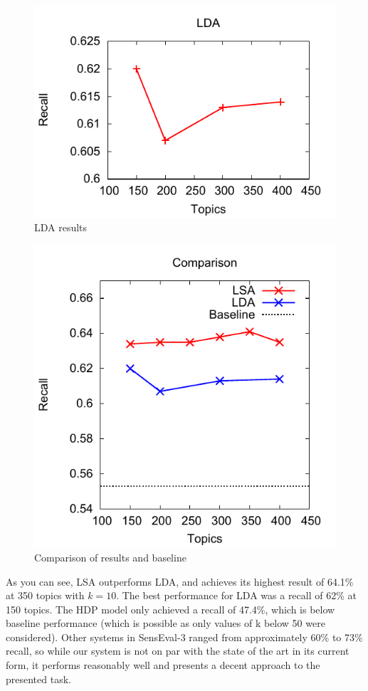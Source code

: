 \begin{figure}
  \includegraphics{plot/lda_lines.pdf}
  \caption{LDA results}
  \label{fig:lda}
\end{figure}

\begin{figure}
  \includegraphics{plot/joined_baseline.pdf}
  \caption{Comparison of results and baseline}
  \label{fig:all}
\end{figure}
As you can see, LSA outperforms LDA, and achieves its highest result of 64.1\% at 350 topics with $k=10$. The best performance for LDA was a recall of 62\% at 150 topics. The HDP model only achieved a recall of 47.4\%, which is below baseline performance (which is possible as only values of k below 50 were considered). Other systems in SensEval-3 ranged from approximately 60\% to 73\% recall\cite{senseval3paper}, so while our system is not on par with the state of the art in its current form, it performs reasonably well and presents a decent approach to the presented task. 


